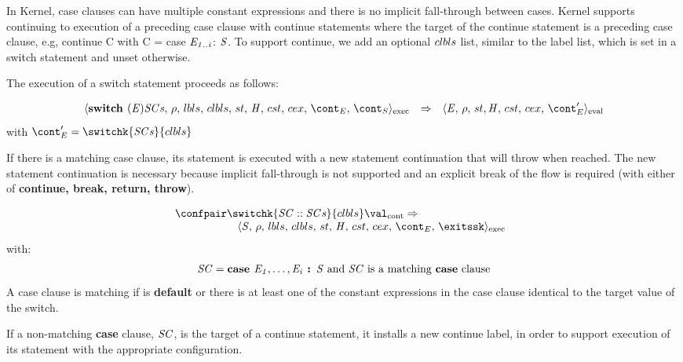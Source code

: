 \documentclass{article}
\begin{document}
In Kernel, case clauses can have multiple constant expressions and there is no implicit fall-through between cases. Kernel supports continuing to execution of a preceding case clause with continue statements where the target of the continue statement is a preceding case clause, e.g, continue C with C = case $\mathit{E}_\mathit{1..i}$: $\mathit{S}$. To support continue, we add an optional $clbls$ list, similar to the label list, which is set in a switch statement and unset otherwise.

The execution of a switch statement proceeds as follows: 

\[
  \begin{array}{lcl}
	\execconf{\textbf{switch }(\expr) \scases }{\env}{\lbls}{\clbls}{\handler}{\cstrace}{\cex}{\econt}{\scont}
	& \Rightarrow &
	\evalconf{\expr}{\env}{\strace}{\cstrace}{\cex}{\econt'}\\
  \end{array}
\]
with $\econt' = \switchk{\scases}{\clbls}$

If there is a matching case clause, its statement is executed with a new statement continuation that will throw when reached. The new statement continuation is necessary because implicit fall-through is not supported and an explicit break of the flow is required (with either of \textbf{continue, break, return, throw}).

\[
  \begin{array}{lcl}
	\contconf{\switchk{\scase :: \scases}{\clbls}}{\val}
	\Rightarrow \hspace{30mm}\\
	\hspace{20mm}\execconf{\stmt}{\env}{\lbls}{\clbls}{\handler}{\cstrace}{\cex}{\econt}{\exitssk}
  \end{array}
\]
with:
\[
	\mathit{SC} = \textbf{case } \mathit{E}_\mathit{1}, \dots, \mathit{E}_\mathit{i} \textbf{ : } \mathit{S} \textrm{ and } \mathit{SC} \textrm{ is a matching \textbf{case} clause}
\]
A case clause is matching if is \textbf{default} or there is at least one of the constant expressions in the case clause identical to the target value of the switch.

\noindent
If a non-matching \textbf{case} clause, $\mathit{SC}$, is the target of a continue statement, it installs a new continue label, in order to support execution of its statement with the appropriate configuration.
\end{document}
